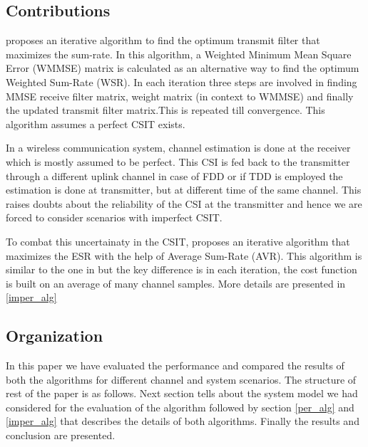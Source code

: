 \documentclass[journal]{IEEEtran}
\begin{document}
\subsection{Contributions}
\cite{prelim} proposes an iterative algorithm to find the optimum transmit filter that maximizes the sum-rate. In this algorithm, a Weighted Minimum Mean Square Error (WMMSE) matrix is calculated as an alternative way to find the optimum Weighted Sum-Rate (WSR). In each iteration three steps are involved in finding MMSE receive filter matrix, weight matrix (in context to WMMSE) and finally the updated transmit filter matrix.This is repeated till convergence. This algorithm assumes a perfect CSIT exists. 
\par In a wireless communication system, channel estimation is done at the receiver which is mostly assumed to be perfect. This CSI is fed back to the transmitter through a different uplink channel in case of FDD or if TDD is employed the estimation is done at transmitter, but at different time of the same channel. This raises doubts about the reliability of the CSI at the transmitter and hence we are forced to consider scenarios with imperfect CSIT.
\par To combat this uncertainaty in the CSIT, \cite{main} proposes an iterative algorithm that maximizes the ESR with the help of Average Sum-Rate (AVR). This algorithm is similar to the one in \cite{prelim} but the key difference is in each iteration, the cost function is built on an average of many channel samples. More details are presented in \ref{imper_alg}
\subsection{Organization}
In this paper we have evaluated the performance and compared the results of both the algorithms for different channel and system scenarios. The structure of rest of the paper is as follows. Next section tells about the system model we had considered for the evaluation of the algorithm followed by section \ref{per_alg} and \ref{imper_alg} that describes the details of both algorithms. Finally the results and conclusion are presented.

\end{document}
